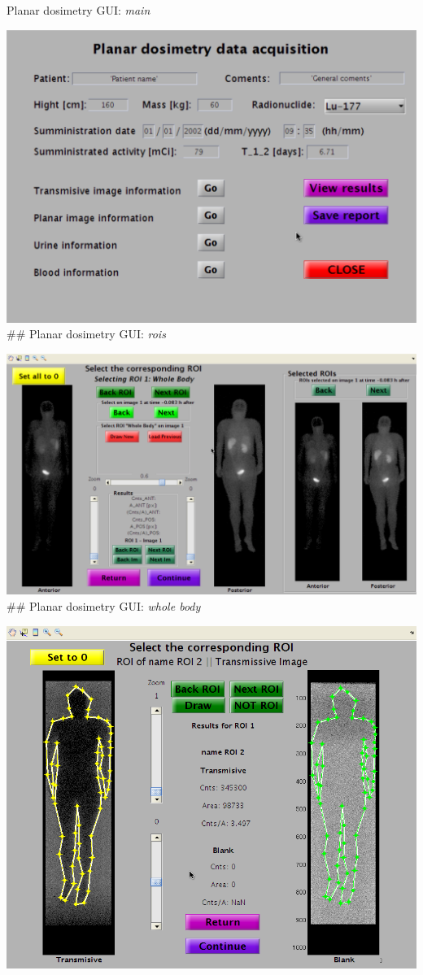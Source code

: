 \documentclass[ignorenonframetext,]{beamer}
\begin{document}
\begin{frame}{Planar dosimetry GUI: \emph{main}}
\protect\hypertarget{planar-dosimetry-gui-main}{}

\includegraphics{imgs/planar-gui.png} \#\# Planar dosimetry GUI:
\emph{rois}

\includegraphics{imgs/planar-rois.png} \#\# Planar dosimetry GUI:
\emph{whole body}

\includegraphics{imgs/planar-wb.png}

\end{frame}
\end{document}
